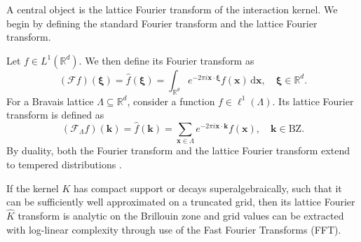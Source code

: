 \documentclass[]{amsart}
\numberwithin{mythm}{section}
\begin{document}
A central object is the lattice Fourier transform of the interaction kernel. We begin by defining the standard Fourier transform and the lattice Fourier transform.
\begin{definition}
    Let $f\in L^1(\mathds R^d)$. We then define its Fourier transform as 
    \[
    (\mathcal F f)(\bm \xi) = \hat f(\bm \xi) = \int_{\mathds R^d} e^{-2\pi i \bm x\cdot \bm \xi} f(\bm x)\,\mathrm d \bm x,\quad \bm \xi \in \mathds R^d.
    \]
    For a Bravais lattice $\Lambda\subseteq \mathds R^d$, consider a function $f\in \ell^{1}(\Lambda)$. Its lattice Fourier transform is defined as 
    \[
    (\mathcal F_\Lambda f)(\bm k)=\hat f(\bm k)=\sum_{\bm x\in \Lambda} e^{-2\pi i \bm x\cdot \bm k} f(\bm x),\quad \bm k\in \mathrm{BZ}.
    \]
    By duality, both the Fourier transform and the lattice Fourier transform extend to tempered distributions \cite{hoermander1966introduction}.
\end{definition}
If the kernel $K$ has compact support or decays superalgebraically, such that it can be sufficiently well approximated on a truncated grid, then its lattice Fourier $\hat K$ transform is analytic on the Brillouin zone and grid values can be extracted with log-linear complexity through use of the Fast Fourier Transforms (FFT).
\end{document}
